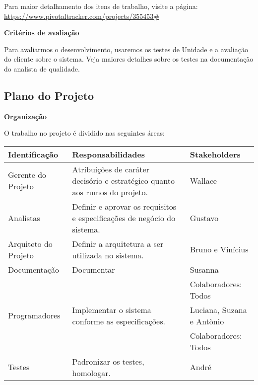 \documentclass[12pt,letterpaper]{article}
\begin{document}
\bigskip

Para maior detalhamento dos itens de trabalho, visite a página: 
\url{https://www.pivotaltracker.com/projects/355453#}

\vspace{1cm}
{\large {\bf Critérios de avaliação}}
\vspace{0.5cm}

Para avaliarmos o desenvolvimento, usaremos os testes de Unidade e a avaliação do cliente sobre o sistema.
Veja maiores detalhes sobre os testes na documentação do analista de qualidade.

\pagebreak
\subsection{Plano do Projeto}


\vspace{1cm}
{\large {\bf Organização}}
\vspace{0.5cm}

O trabalho no projeto é dividido nas seguintes áreas:


\begin{table}[ht!]
\begin{small} %
    \begin{tabular}{| l | p{7cm} | p{5cm} |}
    \hline
    Identificação & Responsabilidades & Stakeholders\\
    \hline
    \hline
    Gerente do Projeto &
    Atribuições de caráter decisório e estratégico quanto aos rumos do projeto. &
    Wallace\\
    \hline
    Analistas &
    Definir e aprovar os requisitos e especificações de negócio do sistema. &
    Gustavo\\
    \hline
    Arquiteto do Projeto &
    Definir a arquitetura a ser utilizada no sistema. &
    Bruno e Vinícius \\
    \hline
    Documentação &
    Documentar &
    Susanna\\
    & & Colaboradores: Todos\\
    \hline
    Programadores &
    Implementar o sistema conforme as especificações. &
    Luciana, Suzana e Antònio\\
    & & Colaboradores: Todos\\
    \hline
    Testes &
    Padronizar os testes, homologar. &
    André\\
    \hline
    \end{tabular}
\end{small}
\end{table}
\end{document}
